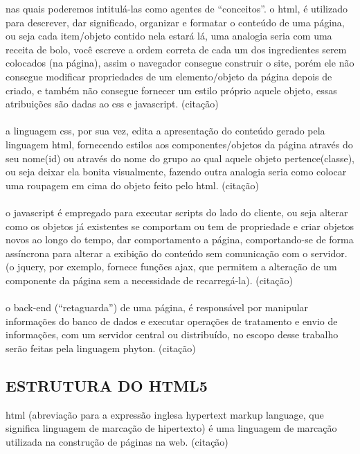 \begin{description}
			nas quais poderemos intitulá-las como agentes de “conceitos”.  
			o html, é utilizado para descrever, dar significado, organizar e formatar o conteúdo de uma página, ou seja cada item/objeto contido nela estará lá, uma analogia seria com uma receita de bolo, você escreve a ordem correta de cada um dos ingredientes serem colocados (na página), assim o navegador consegue construir o site, porém ele não consegue modificar propriedades de um elemento/objeto da página depois de criado, e também não consegue fornecer um estilo próprio aquele objeto, essas atribuições são dadas ao css e javascript. (citação)\\\\			
			a linguagem css, por sua vez, edita a apresentação do conteúdo gerado pela linguagem html, fornecendo estilos aos componentes/objetos da página através do seu nome(id) ou através do nome do grupo ao qual aquele objeto pertence(classe), ou seja deixar ela bonita visualmente, fazendo outra analogia seria como colocar uma roupagem em cima do objeto feito pelo html. (citação)\\\\			
			o javascript é empregado para executar scripts do lado do cliente, ou seja alterar como os objetos já existentes se comportam ou tem de propriedade e criar objetos novos ao longo do tempo, dar comportamento a página, comportando-se de forma assíncrona para alterar a exibição do conteúdo sem comunicação com o servidor. (o jquery, por exemplo, fornece funções ajax, que permitem a alteração de um componente da página sem a necessidade de recarregá-la). (citação)\\\\		
			o back-end (“retaguarda”) de uma página, é responsável por manipular informações do banco de dados e executar operações de tratamento e envio de informações, com um servidor central ou distribuído, no escopo desse trabalho serão feitas pela linguagem phyton. (citação)				
	\end{description} 	
	  
	\subsection{ESTRUTURA DO HTML5}
	\label{subsec:ESTRUTURAHTML5}
	
	html (abreviação para a expressão inglesa hypertext markup language, que significa linguagem de marcação de hipertexto) é uma linguagem de marcação utilizada na construção de páginas na web.  (citação) 
	
